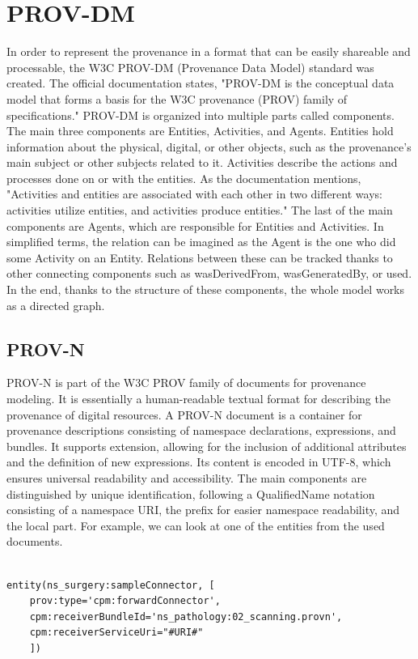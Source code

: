 \documentclass[
  digital,     %
  oneside,     %
  nosansbold,  %
  nocolorbold, %
  lof,         %
  lot,         %
]{fithesis4}
\begin{document}
\section{PROV-DM}
\shorthandoff{-}
In order to represent the provenance in a format that can be easily shareable and processable, the W3C PROV-DM (Provenance Data Model) standard was created. The official documentation states, "PROV-DM is the conceptual data model that forms a basis for the W3C provenance (PROV) family of specifications."  PROV-DM is organized into multiple parts called components. The main three components are Entities, Activities, and Agents. Entities hold information about the physical, digital, or other objects, such as the provenance's main subject or other subjects related to it. Activities describe the actions and processes done on or with the entities. As the documentation mentions, "Activities and entities are associated with each other in two different ways: activities utilize entities, and activities produce entities." The last of the main components are Agents, which are responsible for Entities and Activities. In simplified terms, the relation can be imagined as the Agent is the one who did some Activity on an Entity. Relations between these can be tracked thanks to other connecting components such as wasDerivedFrom, wasGeneratedBy, or used. In the end, thanks to the structure of these components, the whole model works as a directed graph.
\shorthandon{-}

\subsection{PROV-N}
\shorthandoff{-}
PROV-N is part of the W3C PROV family of documents for provenance modeling. It is essentially a human-readable textual format for describing the provenance of digital resources. A PROV-N document is a container for provenance descriptions consisting of namespace declarations, expressions, and bundles. It supports extension, allowing for the inclusion of additional attributes and the definition of new expressions. Its content is encoded in UTF-8, which ensures universal readability and accessibility. The main components are distinguished by unique identification, following a QualifiedName notation consisting of a namespace URI, the prefix for easier namespace readability, and the local part. For example, we can look at one of the entities from the used documents.

\begin{verbatim}

entity(ns_surgery:sampleConnector, [
    prov:type='cpm:forwardConnector', 
    cpm:receiverBundleId='ns_pathology:02_scanning.provn', 
    cpm:receiverServiceUri="#URI#"
    ])
    
\end{verbatim}
\end{document}
